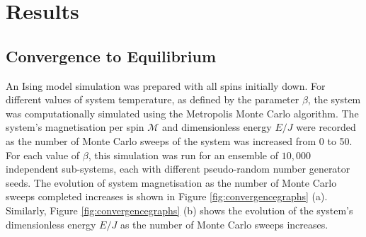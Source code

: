 \documentclass[11pt]{iopart}
\begin{document}
\section{Results}

\subsection{Convergence to Equilibrium}

An Ising model simulation was prepared with all spins initially down. For different values of system temperature, as defined by the parameter $\beta$, the system was computationally simulated using the Metropolis Monte Carlo algorithm. The system's magnetisation per spin $\mathcal{M}$ and dimensionless energy $E/J$ were recorded as the number of Monte Carlo sweeps of the system was increased from 0 to 50. For each value of $\beta$, this simulation was run for an ensemble of $10,000$ independent sub-systems, each with different pseudo-random number generator seeds. The evolution of system magnetisation as the number of Monte Carlo sweeps completed increases is shown in Figure \ref{fig:convergencegraphs} (a). Similarly, Figure \ref{fig:convergencegraphs} (b) shows the evolution of the system's dimensionless energy $E/J$ as the number of Monte Carlo sweeps increases.
\end{document}
